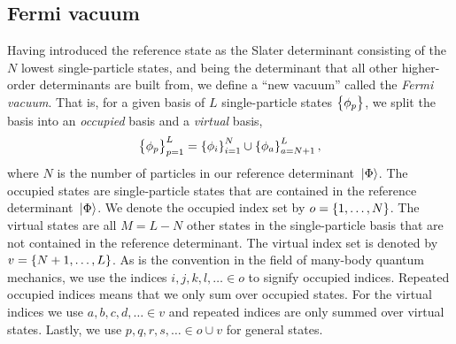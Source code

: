         \subsection{Fermi vacuum}
            \label{subsec:fermi-vacuum}
            Having introduced the reference state as the Slater determinant
            consisting of the $N$ lowest single-particle states, and being the
            determinant that all other higher-order determinants are built from,
            we define a ``new vacuum'' called the \emph{Fermi vacuum}.
            That is, for a given basis of $L$ single-particle states
            $\left\{ \phi_{p} \right\}$, we split the basis into an \emph{occupied} basis
            and a \emph{virtual} basis,
            \begin{align}
                \left\{ \phi_{p} \right\}_{p = 1}^{L}
                = \left\{ \phi_{i} \right\}_{i = 1}^{N}
                \cup
                \left\{ \phi_{a} \right\}_{a = N + 1}^{L},
            \end{align}
            where $N$ is the number of particles in our reference determinant
            $\ket*{\Phi}$.
            The occupied states are single-particle states that are contained in
            the reference determinant $\ket*{\Phi}$.
            We denote the occupied index set by $o = \left\{ 1, \dots, N \right\}$.
            The virtual states are all $M = L - N$ other states in the
            single-particle basis that are not contained in the reference
            determinant.
            The virtual index set is denoted by $v = \left\{ N + 1, \dots, L \right\}$.
            As is the convention in the field of many-body quantum mechanics, we
            use the indices $i, j, k, l, \dots \in o$ to signify occupied
            indices.
            Repeated occupied indices means that we only sum over occupied
            states.
            For the virtual indices we use $a, b, c, d, \dots \in v$ and
            repeated indices are only summed over virtual states.
            Lastly, we use $p, q, r, s, \dots \in o \cup v$ for general states.

